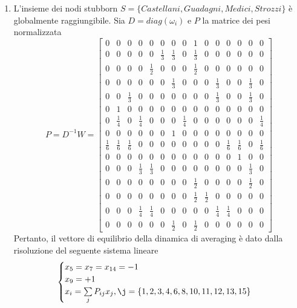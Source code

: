 \documentclass[13pt,largemargins]{homework}
\begin{document}
\begin{enumerate}[label=(\alph*)]
\item %
L'insieme dei nodi stubborn $S=\{Castellani, Guadagni, Medici, Strozzi\}$ è globalmente raggiungibile. Sia $D=diag(\omega_i)$ e \(P\) la matrice dei pesi normalizzata
\[P=D^{-1}W=\begin{bmatrix} 
0 & 0 & 0 & 0 & 0 & 0 & 0 & 0 & 1 & 0 & 0 & 0 & 0 & 0 & 0\\
	0 & 0 & 0 & 0 & 0 & \frac{1}{3} & \frac{1}{3} & 0 & \frac{1}{3} & 0 & 0 & 0 & 0 & 0 & 0\\
	0 & 0 & 0 & 0 & \frac{1}{2} & 0 & 0 & 0 & \frac{1}{2} & 0 & 0 & 0 & 0 & 0 & 0\\
	0 & 0 & 0 & 0 & 0 & 0 & \frac{1}{3} & 0 & 0 & 0 & \frac{1}{3} & 0 & 0 & \frac{1}{3} & 0\\
	0 & 0 & \frac{1}{3} & 0 & 0 & 0 & 0 & 0 & 0 & 0 & \frac{1}{3} & 0 & 0 & \frac{1}{3} & 0\\
	0 & 1 & 0 & 0 & 0 & 0 & 0 & 0 & 0 & 0 & 0 & 0 & 0 & 0 & 0\\
	0 & \frac{1}{4} & 0 & \frac{1}{4} & 0 & 0 & 0 & \frac{1}{4} & 0 & 0 & 0 & 0 & 0 & 0 & \frac{1}{4}\\
	0 & 0 & 0 & 0 & 0 & 0 & 1 & 0 & 0 & 0 & 0 & 0 & 0 & 0 & 0\\
	\frac{1}{6} & \frac{1}{6} & \frac{1}{6} & 0 & 0 & 0 & 0 & 0 & 0 & 0 & 0 & \frac{1}{6} & \frac{1}{6} & 0 & \frac{1}{6}\\
	0 & 0 & 0 & 0 & 0 & 0 & 0 & 0 & 0 & 0 & 0 & 0 & 1 & 0 & 0\\
	0 & 0 & 0 & \frac{1}{3} & \frac{1}{3} & 0 & 0 & 0 & 0 & 0 & 0 & 0 & 0 & \frac{1}{3} & 0\\
	0 & 0 & 0 & 0 & 0 & 0 & 0 & 0 & \frac{1}{2} & 0 & 0 & 0 & 0 & \frac{1}{2} & 0\\
	0 & 0 & 0 & 0 & 0 & 0 & 0 & 0 & \frac{1}{2} & \frac{1}{2} & 0 & 0 & 0 & 0 & 0\\
	0 & 0 & 0 & \frac{1}{4} & \frac{1}{4} & 0 & 0 & 0 & 0 & 0 & \frac{1}{4} & \frac{1}{4} & 0 & 0 & 0\\
	0 & 0 & 0 & 0 & 0 & 0 & \frac{1}{2} & 0 & \frac{1}{2} & 0 & 0 & 0 & 0 & 0 & 0
\end{bmatrix}\]
Pertanto, il vettore di equilibrio della dinamica di averaging è dato dalla risoluzione del seguente sistema lineare
\begin{equation}
	\begin{cases}
		x_5 = x_7 = x_{14} = -1\\
		x_9 = +1\\
		x_i = \sum\limits_{j} P_{ij}x_j, \j=\{1,2,3,4,6,8,10,11,12,13,15\}
	\end{cases}
\end{equation}	


\end{enumerate}
\end{document}
